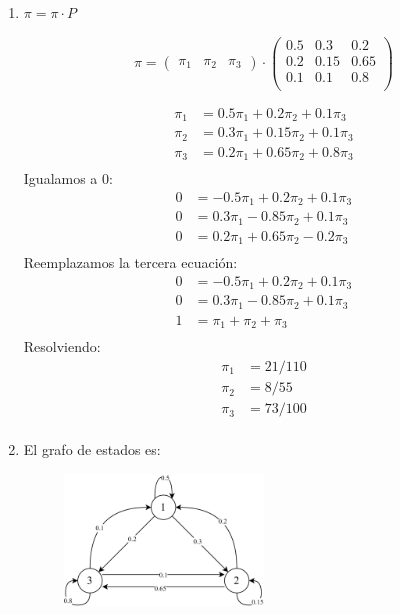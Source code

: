 \documentclass{templateNote}
\begin{document}
\begin{enumerate}[label=\alph*)]
    \item $\pi = \pi \cdot P$
    
    \begin{equation*}
        \pi = 
        \begin{pmatrix}
            \pi_1 & \pi_2 & \pi_3
        \end{pmatrix}
        \cdot
        \begin{pmatrix}
            0.5 & 0.3   & 0.2 \\
            0.2 & 0.15  & 0.65 \\
            0.1 & 0.1   & 0.8 \\
        \end{pmatrix}
    \end{equation*}

    \begin{align*}
        \pi_1 &= 0.5\pi_1 + 0.2\pi_2 + 0.1\pi_3\\
        \pi_2 &= 0.3\pi_1 + 0.15\pi_2 + 0.1\pi_3\\
        \pi_3 &= 0.2\pi_1 + 0.65\pi_2 + 0.8\pi_3\\
    \end{align*}
    Igualamos a 0:
    \begin{align*}
        0 &= - 0.5\pi_1 + 0.2\pi_2 + 0.1\pi_3 \\
        0 &= 0.3\pi_1 - 0.85\pi_2 + 0.1\pi_3\\
        0 &= 0.2\pi_1 + 0.65\pi_2 - 0.2\pi_3\\
    \end{align*}
    Reemplazamos la tercera ecuación:
    \begin{align*}
        0 &= - 0.5\pi_1 + 0.2\pi_2 + 0.1\pi_3 \\
        0 &= 0.3\pi_1 - 0.85\pi_2 + 0.1\pi_3\\
        1 &= \pi_1 + \pi_2 + \pi_3\\
    \end{align*}
    Resolviendo:
    \begin{align*}
        \pi_1 &= 21/110 \\
        \pi_2 &= 8/55 \\
        \pi_3 &= 73/100 \\
    \end{align*}

    \item El grafo de estados es:
    \begin{figure}[H]
        \centering
        \includegraphics[width=0.5\textwidth]{img/ejer9_2.png}
    \end{figure}


\end{enumerate}
\end{document}
